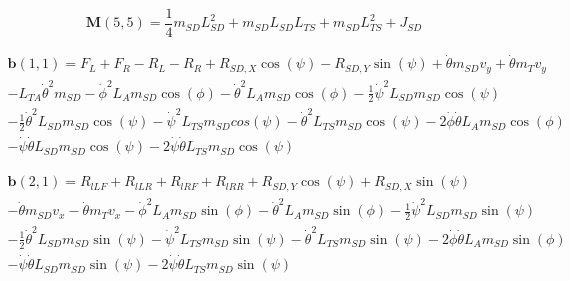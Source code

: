 \begin{linenomath*}
    \begin{equation}
        \mathbf{M}(5,5) = \frac{1}{4}m_{SD}L_{SD}^2 + m_{SD}L_{SD}L_{TS} + m_{SD}L_{TS}^2 + J_{SD}
    \end{equation}
\end{linenomath*}
\begin{linenomath*}
    \vspace{-20pt}
    \begin{multline}
        \mathbf{b}(1,1) = F_L + F_R - R_L - R_R + R_{SD,X}\cos(\psi) - R_{SD,Y}\sin(\psi) + \dot\theta m_{SD}v_y + \dot\theta m_Tv_y\\ - L_{TA}\dot\theta^2m_{SD} - \dot\phi^2L_{A}m_{SD}\cos(\phi) - \dot\theta^2L_{A}m_{SD}\cos(\phi) - \frac{1}{2}\dot\psi^2L_{SD}m_{SD}\cos(\psi)\\ - \frac{1}{2}\dot\theta^2L_{SD}m_{SD}\cos(\psi) - \dot\psi^2L_{TS}m_{SD}cos(\psi) - \dot\theta^2L_{TS}m_{SD}\cos(\psi) - 2\dot\phi\dot\theta L_{A}m_{SD}\cos(\phi)\\ - \dot\psi\dot\theta L_{SD}m_{SD}\cos(\psi) - 2\dot\psi\dot\theta L_{TS}m_{SD}\cos(\psi)
    \end{multline}
\end{linenomath*}
\begin{linenomath*}
\vspace{-20pt}
    \begin{multline}
        \mathbf{b}(2,1) = R_{lLF} + R_{lLR} + R_{lRF} + R_{lRR} + R_{SD,Y}\cos(\psi) + R_{SD,X}\sin(\psi)\\ - \dot\theta m_{SD}v_x - \dot\theta m_Tv_x - \dot\phi^2L_{A}m_{SD}\sin(\phi) - \dot\theta^2L_{A}m_{SD}\sin(\phi) - \frac{1}{2}\dot\psi^2L_{SD}m_{SD}\sin(\psi)\\ - \frac{1}{2}\dot\theta^2L_{SD}m_{SD}\sin(\psi) - \dot\psi^2L_{TS}m_{SD}\sin(\psi) - \dot\theta^2L_{TS}m_{SD}\sin(\psi) - 2\dot\phi\dot\theta L_{A}m_{SD}\sin(\phi)\\ - \dot\psi\dot\theta L_{SD}m_{SD}\sin(\psi) - 2\dot\psi\dot\theta L_{TS}m_{SD}\sin(\psi)
    \end{multline}
\end{linenomath*}
